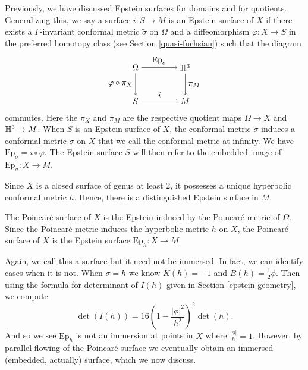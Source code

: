 Previously, we have discussed Epstein surfaces for domains and for quotients. 
Generalizing this, we say a surface $i : S \to M$ is an Epstein surface of $X$ if there exists a $\Gamma$-invariant conformal metric $\tilde{\sigma}$ on $\Omega$ and a diffeomorphism $\varphi : X \to S$ in the preferred homotopy class (see Section \ref{quasi-fuchsian}) such that the diagram 
\[
\begin{tikzpicture}[scale=0.7]
\node (1) at (0,2) {$\Omega$};
\node (2) at (3,2) {$\H^3$};
\node (3) at (0,0) {$S$};
\node (4) at (3,0) {$M$};


\draw[->] (1) to node [above] {$\mathrm{Ep}_{\tilde{\sigma}}$} (2);
\draw[->] (1) to node [left] {$\varphi \circ \pi_X$} (3);
\draw[->] (3) to node [above] {$i$} (4);
\draw[->] (2) to node [right] {$\pi_M$} (4);

\end{tikzpicture}
\]
commutes. 
Here the $\pi_X$ and $\pi_M$ are the respective quotient maps $\Omega \to X$ and $\mathbb{H}^3 \to M$.
When $S$ is an Epstein surface of $X$, the conformal metric $\tilde{\sigma}$ induces a conformal metric $\sigma$ on $X$ that we call the conformal metric at infinity. 
We have $\mathrm{Ep}_{\sigma} = i \circ \varphi$. 
The Epstein surface $S$ will then refer to the embedded image of $\mathrm{Ep}_{\sigma}: X \to M$. 

Since $X$ is a closed surface of genus at least 2, it possesses a unique hyperbolic conformal metric $h$. 
Hence, there is a distinguished Epstein surface in $M$. 

\begin{defn}
The Poincar\'e surface of $X$ is the Epstein induced by the Poincar\'e metric of $\Omega$. 
Since the Poincar\'e metric induces the hyperbolic metric $h$ on $X$, the Poincar\'e surface of $X$ is the Epstein surface $\mathrm{Ep}_h: X \to M$.
\end{defn}


Again, we call this a surface but it need not be immersed. 
In fact, we can identify cases when it is not. 
When $\sigma = h$ we know $K(h) = -1$ and $B(h) = \frac{1}{2}\phi$. 
Then using the formula for determinant of $I(h)$ given in Section \ref{epstein-geometry}, we compute
\[
\det(I(h)) = 16 \left( 1 - \frac{|\phi|^2}{h^2} \right)^2 \det(h).
\]
And so we see $\mathrm{Ep}_h$ is not an immersion at points in $X$ where $\frac{|\phi|}{h} =1$. 
However, by parallel flowing of the Poincar\'e surface we eventually obtain an immersed (embedded, actually) surface, which we now discuss. 


